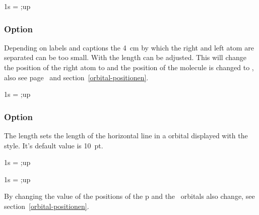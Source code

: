 \documentclass[load-preamble+]{cnltx-doc}
\begin{document}
\begin{example}
  \begin{modiagram}[style=fancy]
     { 1s = {;up} }
  \end{modiagram}
\end{example}

\subsubsection{Option }\label{option:distance}
Depending on labels and captions the \SI{4}{\centi\metre} by which the right
and left atom are separated can be too small. With  the
length can be adjusted. This will change the position of the right atom to
 and the position of the molecule is changed to
, also see page~\pageref{xshift} and
section~\ref{orbital-positionen}.
\begin{example}
  \begin{modiagram}[distance=6cm]
     { 1s = {;up} }
  \end{modiagram}
\end{example}

\subsubsection{Option }\label{option:AO-width}
The length  sets the length of the horizontal line in a
orbital displayed with the  style. It's default value is
\SI{10}{pt}.
\begin{example}
  \begin{modiagram}[AO-width=15pt]
     { 1s = {;up} }
  \end{modiagram}
\end{example}

\begin{example}
  \begin{modiagram}[style=fancy,AO-width=15pt]
     { 1s = {;up} }
  \end{modiagram}
\end{example}
By changing the value of  the positions of the p and the
\chempi\ orbitals also change, see section~\ref{orbital-positionen}.
\end{document}
